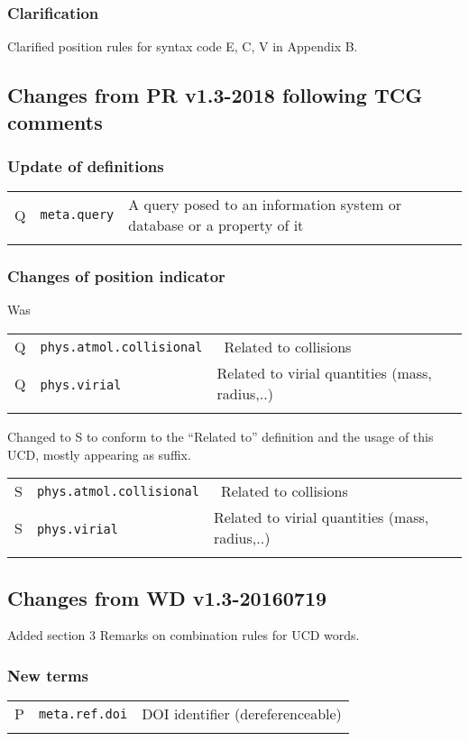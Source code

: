 \documentclass[11pt,a4paper]{ivoa}
\begin{document}
\subsubsection*{Clarification}
Clarified position rules for syntax code E, C, V in Appendix B.  

\subsection{Changes from PR v1.3-2018 following TCG comments}
\subsubsection*{Update of definitions} 
\footnotesize\begin{longtable}[h!]{c|p{40ex}|p{}}
\sptablerule
Q & {\tt meta.query} &  A query posed to an information system or database or a property of it\\
\sptablerule
\end{longtable}

\subsubsection*{Changes of position indicator} 
Was
\footnotesize\begin{longtable}[h!]{c|p{40ex}|p{}}
\sptablerule
Q & {\tt phys.atmol.collisional} & Related to collisions\\
Q & {\tt phys.virial}            & Related to virial quantities (mass, radius,..)\\
\sptablerule
\end{longtable}
Changed to S to conform to the “Related to” definition and the usage of this UCD, mostly appearing as suffix.  
\footnotesize\begin{longtable}[h!]{c|p{40ex}|p{}}
\sptablerule
S & {\tt phys.atmol.collisional} & Related to collisions\\
S & {\tt phys.virial}            & Related to virial quantities (mass, radius,..)\\
\sptablerule
\end{longtable}

\subsection{Changes from WD v1.3-20160719}
Added section 3 Remarks on combination rules for UCD words.

\subsubsection*{New terms}
\footnotesize\begin{longtable}[h!]{c|p{40ex}|p{}}
\sptablerule
P & {\tt meta.ref.doi} & DOI identifier (dereferenceable)\\
\sptablerule
\end{longtable}
\end{document}
